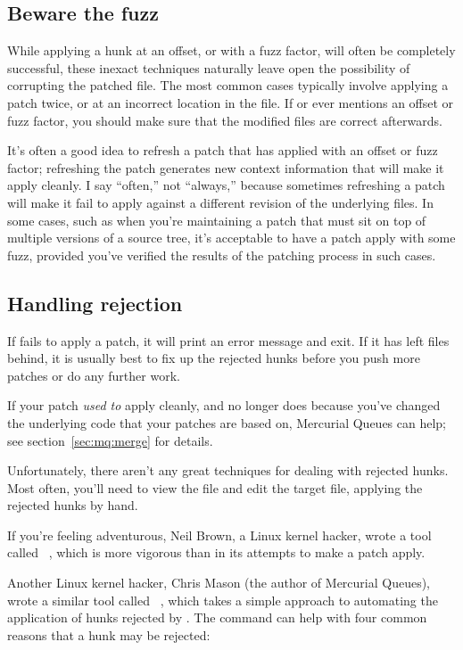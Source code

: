 \subsection{Beware the fuzz}

While applying a hunk at an offset, or with a fuzz factor, will often
be completely successful, these inexact techniques naturally leave
open the possibility of corrupting the patched file.  The most common
cases typically involve applying a patch twice, or at an incorrect
location in the file.  If  or  ever
mentions an offset or fuzz factor, you should make sure that the
modified files are correct afterwards.  

It's often a good idea to refresh a patch that has applied with an
offset or fuzz factor; refreshing the patch generates new context
information that will make it apply cleanly.  I say ``often,'' not
``always,'' because sometimes refreshing a patch will make it fail to
apply against a different revision of the underlying files.  In some
cases, such as when you're maintaining a patch that must sit on top of
multiple versions of a source tree, it's acceptable to have a patch
apply with some fuzz, provided you've verified the results of the
patching process in such cases.

\subsection{Handling rejection}

If  fails to apply a patch, it will print an error
message and exit.  If it has left  files behind, it is
usually best to fix up the rejected hunks before you push more patches
or do any further work.

If your patch \emph{used to} apply cleanly, and no longer does because
you've changed the underlying code that your patches are based on,
Mercurial Queues can help; see section~\ref{sec:mq:merge} for details.

Unfortunately, there aren't any great techniques for dealing with
rejected hunks.  Most often, you'll need to view the 
file and edit the target file, applying the rejected hunks by hand.

If you're feeling adventurous, Neil Brown, a Linux kernel hacker,
wrote a tool called ~\cite{web:wiggle}, which is more
vigorous than  in its attempts to make a patch apply.

Another Linux kernel hacker, Chris Mason (the author of Mercurial
Queues), wrote a similar tool called
~\cite{web:mpatch}, which takes a simple approach to
automating the application of hunks rejected by .  The
 command can help with four common reasons that a hunk
may be rejected:

